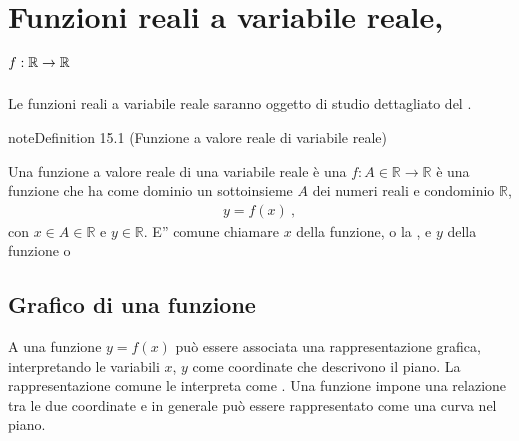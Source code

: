 \documentclass[letterpaper,10pt,italian]{jupyterBook}
\begin{document}
\chapter{Funzioni reali a variabile reale, \protect\(f: \mathbb{R} \rightarrow \mathbb{R}\protect\)}
\label{\detokenize{ch/precalculus/real-functions:funzioni-reali-a-variabile-reale-f-mathbb-r-rightarrow-mathbb-r}}\label{\detokenize{ch/precalculus/real-functions:math-hs-precalculus-real-functions}}\label{\detokenize{ch/precalculus/real-functions::doc}}
\sphinxAtStartPar
Le funzioni reali a variabile reale saranno oggetto di studio dettagliato del .
\label{ch/precalculus/real-functions:definition-0}
\begin{sphinxadmonition}{note}{Definition 15.1 (Funzione a valore reale di variabile reale)}



\sphinxAtStartPar
Una funzione a valore reale di una variabile reale è una {\hyperref[\detokenize{ch/set:math-hs-fun}]{}} \(f: A \in \mathbb{R} \rightarrow \mathbb{R}\) è una funzione che ha come dominio un sottoinsieme \(A\) dei numeri reali e condominio \(\mathbb{R}\),
\begin{equation*}
\begin{split}y = f(x) \ ,\end{split}
\end{equation*}
\sphinxAtStartPar
con \(x \in A \in \mathbb{R}\) e \(y \in \mathbb{R}\). E” comune chiamare \(x\)  della funzione, o la , e \(y\)  della funzione o 
\end{sphinxadmonition}


\section{Grafico di una funzione}
\label{\detokenize{ch/precalculus/real-functions:grafico-di-una-funzione}}\label{\detokenize{ch/precalculus/real-functions:math-hs-precalculus-real-functions-inverse-plot}}
\sphinxAtStartPar
A una funzione \(y = f(x)\) può essere associata una rappresentazione grafica, interpretando le variabili \(x\), \(y\) come coordinate che descrivono il piano. La rappresentazione comune le interpreta come . Una funzione impone una relazione tra le due coordinate e in generale può essere rappresentato come una curva nel piano.
\end{document}
